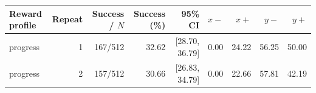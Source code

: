 \begin{tabular}{lrrrrrrrr}
\hline
Reward profile & Repeat & Success / $N$ & Success (\%) & 95\% CI & $x-$ & $x+$ & $y-$ & $y+$ \\
\hline
progress & 1 & 167/512 & 32.62 & [28.70, 36.79] & 0.00 & 24.22 & 56.25 & 50.00 \\
progress & 2 & 157/512 & 30.66 & [26.83, 34.79] & 0.00 & 22.66 & 57.81 & 42.19 \\
\hline
\end{tabular}
